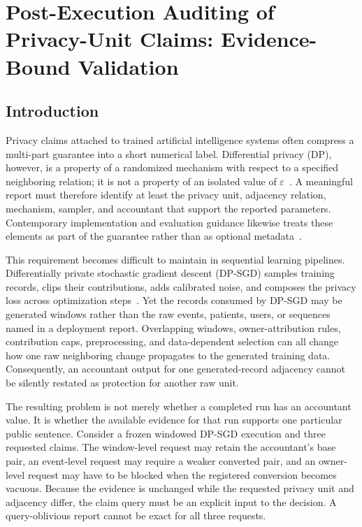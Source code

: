 \chapter[Post-Execution Auditing of Privacy-Unit Claims]{Post-Execution Auditing of Privacy-Unit Claims: Evidence-Bound Validation}
\label{ch:post-execution-validation}

\section{Introduction}
\label{sec:post-execution-introduction}

Privacy claims attached to trained artificial intelligence systems often compress a
multi-part guarantee into a short numerical label.  Differential privacy (DP),
however, is a property of a randomized mechanism with respect to a specified
neighboring relation; it is not a property of an isolated value of
$\varepsilon$~\cite{dwork2014algorithmic}.  A meaningful report must therefore
identify at least the privacy unit, adjacency relation, mechanism, sampler, and
accountant that support the reported parameters.  Contemporary implementation and
evaluation guidance likewise treats these elements as part of the guarantee rather
than as optional metadata~\cite{kifer2020guidelines,ponomareva2023dpify,near2025guidelines}.

This requirement becomes difficult to maintain in sequential learning pipelines.
Differentially private stochastic gradient descent (DP-SGD) samples training
records, clips their contributions, adds calibrated noise, and composes the privacy
loss across optimization steps~\cite{abadi2016deep}.  Yet the records consumed by
DP-SGD may be generated windows rather than the raw events, patients, users, or
sequences named in a deployment report.  Overlapping windows, owner-attribution
rules, contribution caps, preprocessing, and data-dependent selection can all
change how one raw neighboring change propagates to the generated training data.
Consequently, an accountant output for one generated-record adjacency cannot be
silently restated as protection for another raw unit.

The resulting problem is not merely whether a completed run has an accountant
value.  It is whether the available evidence for that run supports one particular
public sentence.  Consider a frozen windowed DP-SGD execution and three requested
claims.  The window-level request may retain the accountant's base pair, an
event-level request may require a weaker converted pair, and an owner-level request
may have to be blocked when the registered conversion becomes vacuous.  Because
the evidence is unchanged while the requested privacy unit and adjacency differ,
the claim query must be an explicit input to the decision.  A query-oblivious
report cannot be exact for all three requests.

